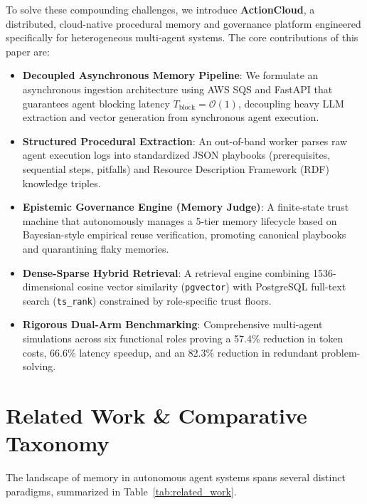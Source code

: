 \documentclass[lettersize,journal]{IEEEtran}
\begin{document}
To solve these compounding challenges, we introduce \textbf{ActionCloud}, a distributed, cloud-native procedural memory and governance platform engineered specifically for heterogeneous multi-agent systems. The core contributions of this paper are:
\begin{itemize}
    \item \textbf{Decoupled Asynchronous Memory Pipeline}: We formulate an asynchronous ingestion architecture using AWS SQS and FastAPI that guarantees agent blocking latency $T_{\text{block}} = \mathcal{O}(1)$, decoupling heavy LLM extraction and vector generation from synchronous agent execution.
    \item \textbf{Structured Procedural Extraction}: An out-of-band worker parses raw agent execution logs into standardized JSON playbooks (prerequisites, sequential steps, pitfalls) and Resource Description Framework (RDF) knowledge triples.
    \item \textbf{Epistemic Governance Engine (Memory Judge)}: A finite-state trust machine that autonomously manages a 5-tier memory lifecycle based on Bayesian-style empirical reuse verification, promoting canonical playbooks and quarantining flaky memories.
    \item \textbf{Dense-Sparse Hybrid Retrieval}: A retrieval engine combining 1536-dimensional cosine vector similarity (\texttt{pgvector}) with PostgreSQL full-text search (\texttt{ts\_rank}) constrained by role-specific trust floors.
    \item \textbf{Rigorous Dual-Arm Benchmarking}: Comprehensive multi-agent simulations across six functional roles proving a 57.4\% reduction in token costs, 66.6\% latency speedup, and an 82.3\% reduction in redundant problem-solving.
\end{itemize}

\section{Related Work \& Comparative Taxonomy}
The landscape of memory in autonomous agent systems spans several distinct paradigms, summarized in Table~\ref{tab:related_work}.
\end{document}
